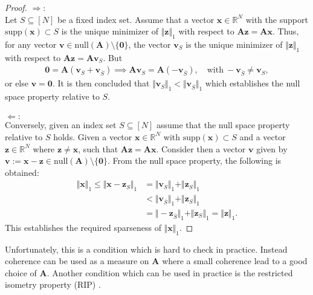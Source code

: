 \begin{proof}
$\Rightarrow:$  \\
Let $S \subseteq [N]$ be a fixed index set. Assume that a vector $\mathbf{x} \in \mathbb{R}^N$ with the support $\text{supp}(\mathbf{x})\subset S$ is the unique minimizer of $\Vert \mathbf{z} \Vert_1$ with respect to $\mathbf{Az} = \mathbf{Ax}$. 
Thus, for any vector $\mathbf{v} \in \text{null}(\mathbf{A}) \setminus \{\mathbf{0} \}$, the vector $\mathbf{v}_S$ is the unique minimizer of $\Vert \mathbf{z} \Vert_1$ with respect to $\mathbf{Az} = \mathbf{Av}_S$. 
But 
\begin{align*}
\mathbf{0} = \mathbf{A}(\mathbf{v}_S + \mathbf{v}_{\overline{S}}) \implies \mathbf{Av}_S = \mathbf{A}(-\mathbf{v}_{\overline{S}}), \quad \text{with} \ -\mathbf{v}_{\overline{S}} \neq \mathbf{v}_S,
\end{align*}
or else $\mathbf{v} = \mathbf{0}$. 
It is then concluded that $\Vert \mathbf{v}_S \Vert_1 < \Vert \mathbf{v}_{\overline{S}} \Vert_1$ which establishes the null space property relative to $S$.
\\ \\
$\Leftarrow:$ \\  
Conversely, given an index set $S \subseteq [N]$ assume that the null space property relative to $S$ holds. Given a vector $\mathbf{x} \in \mathbb{R}^N$ with $\text{supp}(\mathbf{x})\subset S$ and a vector $\mathbf{z} \in \mathbb{R}^N$ where $\mathbf{z} \neq \mathbf{x}$, such that $\mathbf{Az} = \mathbf{Ax}$. Consider then a vector $\mathbf{v}$ given by $\mathbf{v} := \mathbf{x} - \mathbf{z} \in \text{null}(\mathbf{A}) \setminus \{ \mathbf{0} \}$. 
From the null space property, the following is obtained:
\begin{align*}
\Vert \mathbf{x} \Vert_1 \leq \Vert \mathbf{x} - \mathbf{z}_S \Vert_1 &= \Vert \mathbf{v}_S \Vert_1 + \Vert \mathbf{z}_S \Vert_1 \\
&< \Vert \mathbf{v}_{\overline{S}} \Vert_1 + \Vert \mathbf{z}_S \Vert_1 \\
&= \Vert -\mathbf{z}_{\overline{S}} \Vert_1 + \Vert \mathbf{z}_S \Vert_1 = \Vert \mathbf{z} \Vert_1.
\end{align*}
This establishes the required sparseness of $\Vert \mathbf{x} \Vert_1$.
\end{proof}
Unfortunately, this is a condition which is hard to check in practice. Instead coherence can be used as a measure on $\mathbf{A}$ where a small coherence lead to a good choice of $\mathbf{A}$. Another condition which can be used in practice is the restricted isometry property (RIP) \cite{??}.

